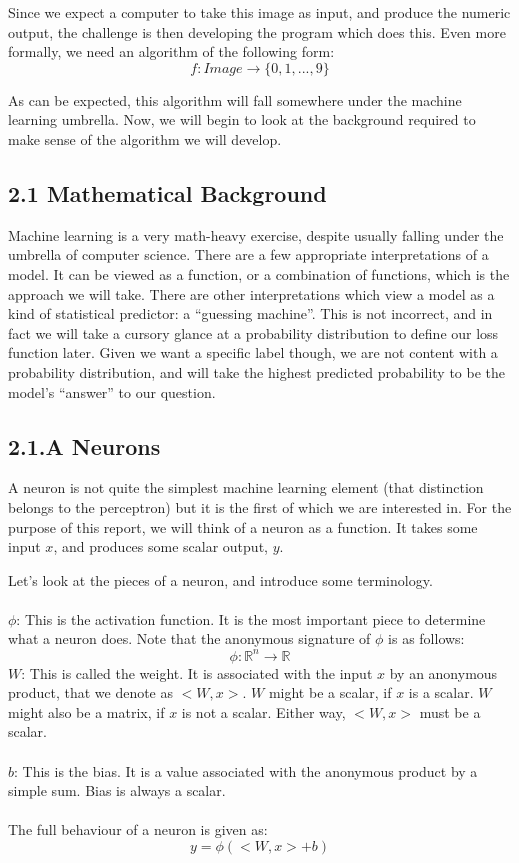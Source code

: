 \documentclass{article}
\begin{document}
Since we expect a computer to take this image as input, and produce the numeric output, the challenge is then developing the program which does this. Even more formally, we need an algorithm of the following form: 
\[f: Image \rightarrow \{0,1,...,9\}\]

As can be expected, this algorithm will fall somewhere under the machine learning umbrella. Now, we will begin to look at the background required to make sense of the algorithm we will develop.
\\
\subsection*{2.1 Mathematical Background}
Machine learning is a very math-heavy exercise, despite usually falling under the umbrella of computer science. There are a few appropriate interpretations of a model. It can be viewed as a function, or a combination of functions, which is the approach we will take. There are other interpretations which view a model as a kind of statistical predictor: a “guessing machine”. This is not incorrect, and in fact we will take a cursory glance at a probability distribution to define our loss function later. Given we want a specific label though, we are not content with a probability distribution, and will take the highest predicted probability to be the model’s “answer” to our question.
\\
\subsection*{2.1.A Neurons}
A neuron is not quite the simplest machine learning element (that distinction belongs to the perceptron) but it is the first of which we are interested in. For the purpose of this report, we will think of a neuron as a function. It takes some input $x$, and produces some scalar output, $y$.

Let’s look at the pieces of a neuron, and introduce some terminology.\\\\
$\phi$: This is the activation function. It is the most important piece to determine what a neuron does. Note that the anonymous signature of $\phi$ is as follows:
\[\phi: \mathbb{R}^n \rightarrow \mathbb{R}\]
$W$: This is called the weight. It is associated with the input $x$ by an anonymous product, that we denote as $<W, x>$. $W$ might be a scalar, if $x$ is a scalar. $W$ might also be a matrix, if $x$ is not a scalar. Either way, $<W,x>$ must be a scalar.\\\\
$b$: This is the bias. It is a value associated with the anonymous product by a simple sum. Bias is always a scalar.\\\\
The full behaviour of a neuron is given as:
\[y = \phi( <W,x> + b )\]
\end{document}
